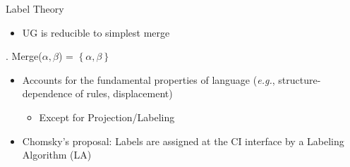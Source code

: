 \documentclass[Proposal]{subfiles}
\begin{document}
\begin{frame}
  {Label Theory}
  {\textcite{chomsky2013problems,chomsky2015problems}}
  \begin{itemize}
    \item UG is reducible to simplest merge
  \end{itemize}
  \ex. Merge($\alpha,\beta$) = $\left\{ \alpha,\beta \right\}$

  \begin{itemize}
    \item Accounts for the fundamental properties of language (\textit{e.g.}, structure-dependence of rules, displacement)
      \begin{itemize}
	\item Except for Projection/Labeling
      \end{itemize}
    \item Chomsky's proposal: Labels are assigned at the CI interface by a Labeling Algorithm (LA)
  \end{itemize}
\end{frame}
\end{document}
